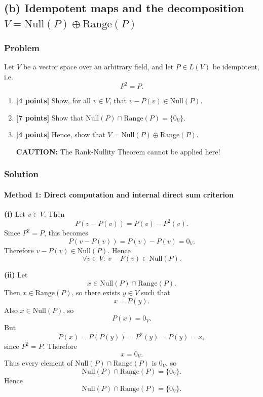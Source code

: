 \documentclass[12pt]{article}
\begin{document}
\bigskip
\subsection{(b) Idempotent maps and the decomposition \(V=\mathrm{Null}(P)\oplus \mathrm{Range}(P)\)}
\subsubsection{Problem}
Let \(V\) be a vector space over an arbitrary field, and let \(P\in L(V)\) be idempotent, i.e.
\[
P^2=P.
\]

\begin{enumerate}[label=(\roman*)]
\item \textbf{[4 points]} Show, for all \(v\in V\), that \(v-P(v)\in \mathrm{Null}(P)\).
\item \textbf{[7 points]} Show that \(\mathrm{Null}(P)\cap \mathrm{Range}(P)=\{0_V\}\).
\item \textbf{[4 points]} Hence, show that \(V=\mathrm{Null}(P)\oplus \mathrm{Range}(P)\).

\textbf{CAUTION: }The Rank-Nullity Theorem cannot be applied here!
\end{enumerate}
\newpage
\subsubsection{Solution}

\paragraph{Method 1: Direct computation and internal direct sum criterion}

\noindent \textbf{(i)} Let \(v\in V\). Then
\[
P(v-P(v))=P(v)-P^2(v).
\]
Since \(P^2=P\), this becomes
\[
P(v-P(v))=P(v)-P(v)=0_V.
\]
Therefore \(v-P(v)\in \mathrm{Null}(P)\). Hence
\[
\boxed{\forall v\in V:\ v-P(v)\in \mathrm{Null}(P).}
\]

\medskip

\noindent \textbf{(ii)} Let
\[
x\in \mathrm{Null}(P)\cap \mathrm{Range}(P).
\]
Then \(x\in \mathrm{Range}(P)\), so there exists \(y\in V\) such that
\[
x=P(y).
\]
Also \(x\in \mathrm{Null}(P)\), so
\[
P(x)=0_V.
\]
But
\[
P(x)=P(P(y))=P^2(y)=P(y)=x,
\]
since \(P^2=P\). Therefore
\[
x=0_V.
\]
Thus every element of \(\mathrm{Null}(P)\cap \mathrm{Range}(P)\) is \(0_V\), so
\[
\mathrm{Null}(P)\cap \mathrm{Range}(P)=\{0_V\}.
\]
Hence
\[
\boxed{\mathrm{Null}(P)\cap \mathrm{Range}(P)=\{0_V\}.}
\]
\end{document}
